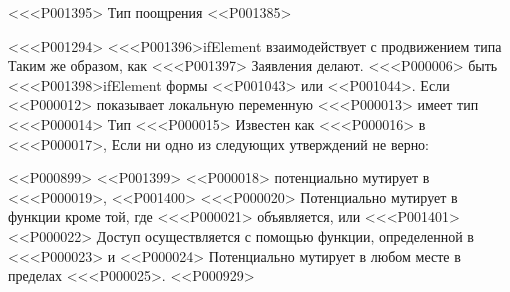 <<<P001395> Тип поощрения
<<P001385>

<<<P001294>%
<<<P001396>{ifElement} взаимодействует с продвижением типа
Таким же образом, как <<<P001397> Заявления делают.
<<<P000006> быть <<<P001398>{ifElement} формы
<<P001043> или
<<P001044>.
Если <<P000012> показывает локальную переменную <<<P000013> имеет тип <<<P000014>
Тип <<<P000015> Известен как <<<P000016> в <<<P000017>,
Если ни одно из следующих утверждений не верно:

<<P000899>
<<P001399> <<P000018> потенциально мутирует в <<<P000019>,
<<P001400> <<<P000020> Потенциально мутирует в функции
кроме той, где <<<P000021> объявляется, или
<<<P001401> <<P000022> Доступ осуществляется с помощью функции, определенной в <<<P000023> и
<<P000024> Потенциально мутирует в любом месте в пределах <<<P000025>.
<<P000929>

